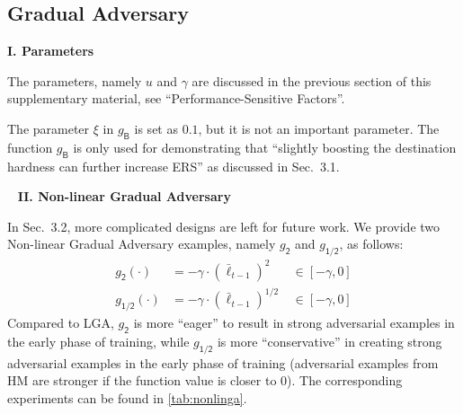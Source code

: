 \subsection{Gradual Adversary}
\label{sec:b3}

\noindent\textbf{I. Parameters}

The parameters, namely $u$ and $\gamma$ are discussed in the previous section
of this supplementary material, see ``Performance-Sensitive Factors''.

The parameter $\xi$ in $g_\mathsf{B}$ is set as $0.1$, but it is not an important parameter.
%
The function $g_\mathsf{B}$ is only used for demonstrating that ``slightly
boosting the destination hardness can further increase ERS'' as discussed
in Sec.~3.1.


~\newline
\noindent\textbf{II. Non-linear Gradual Adversary}

In Sec.~3.2, more complicated designs are left for future work.
%
We provide two Non-linear Gradual Adversary examples, namely
$g_\mathsf{2}$ and $g_\mathsf{1/2}$, as follows:
%
\begin{align}
	g_\mathsf{2}(\cdot)   &= -\gamma \cdot (\bar{\ell}_{t-1})^{2}  &~ \in [-\gamma,0]\\
	g_\mathsf{1/2}(\cdot) &= -\gamma \cdot (\bar{\ell}_{t-1})^{1/2} &~ \in [-\gamma, 0]
\end{align}
%
Compared to LGA, $g_\mathsf{2}$ is more ``eager'' to result in strong adversarial
examples in the early phase of training, while $g_\mathsf{1/2}$ is more ``conservative''
in creating strong adversarial examples in the early phase of training
(adversarial examples from HM are stronger if the function value is closer to $0$).
%
The corresponding experiments can be found in \cref{tab:nonlinga}.

